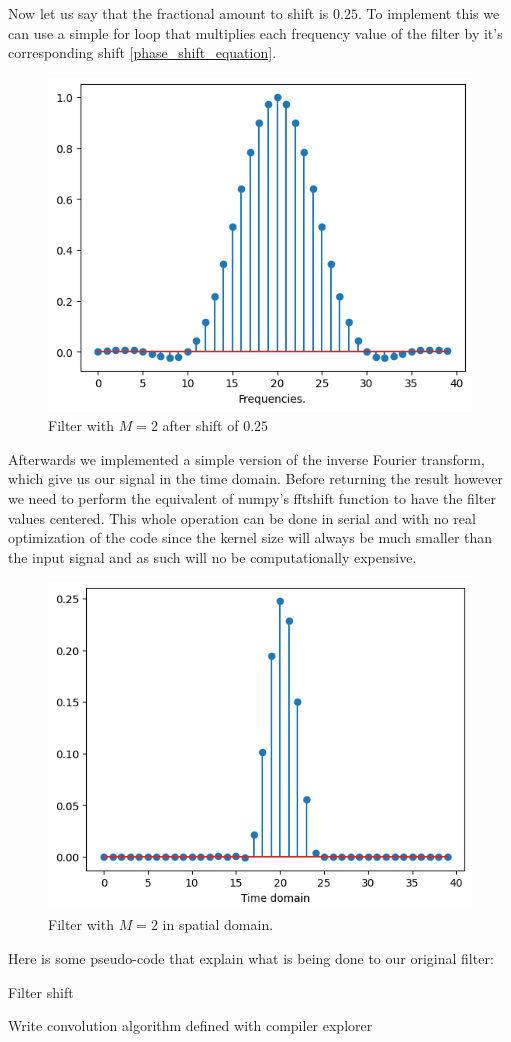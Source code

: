 \documentclass[]{usiinfbachelorproject}
\begin{document}
	Now let us say that the fractional amount to shift is $0.25$. To implement this we can use a simple for loop that multiplies each frequency value of the filter by it's corresponding shift \ref{phase_shift_equation}.
	\begin{figure}[h]
		\centering
		\includegraphics[width=0.4\columnwidth]{images/filter_m_2_25_shift.png}
		\caption{Filter with $M=2$ after shift of $0.25$}
		\label{shifted_filter}
	\end{figure}
	
	Afterwards we implemented a simple version of the inverse Fourier transform, which give us our signal in the time domain. Before returning the result however we need to perform the equivalent of numpy's fftshift function to have the filter values centered. This whole operation can be done in serial and with no real optimization of the code since the kernel size will always be much smaller than the input signal and as such will no be computationally expensive.
	\begin{figure}[h]
		\centering
		\includegraphics[width=0.4\columnwidth]{images/ifft_filter_m_2_25_shift.png}
		\caption{Filter with $M=2$ in spatial domain.}
		\label{final_filter}
	\end{figure}
	
	
	
	Here is some pseudo-code that explain what is being done to our original filter:
	\begin{algorithm}
		\caption{Filter shift}\label{alg:cap}
		Write convolution algorithm defined with compiler explorer
	\end{algorithm}
	
	
	\iffalse
\end{document}
